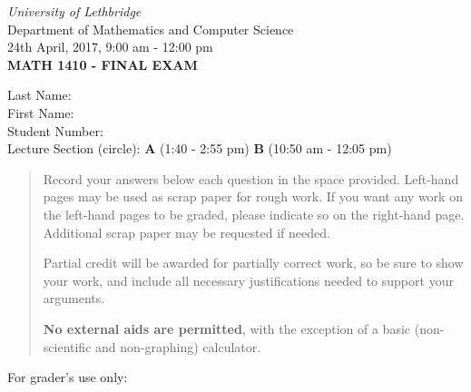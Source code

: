 \documentclass[12pt]{article}
\newcommand{\skipline}{\vspace{12pt}}
\begin{document}
\author{Instructor: Sean Fitzpatrick}
\thispagestyle{plain}
\begin{center}
\emph{University of Lethbridge}\\
Department of Mathematics and Computer Science\\
24th April, 2017, 9:00 am - 12:00 pm\\
{\bf MATH 1410 - FINAL EXAM}\\
\end{center}
\skipline \skipline \skipline \noindent \skipline
Last Name:\underline{\hspace{350pt}}\\
\skipline
First Name:\underline{\hspace{348pt}}\\
\skipline
Student Number:\underline{\hspace{322pt}}\\
\skipline
Lecture Section (circle): \quad \textbf{A} (1:40 - 2:55 pm) \qquad \textbf{B} (10:50 am - 12:05 pm)


\vspace{0.1in}


\begin{quote}

 
 Record your answers below each question in the space provided.    Left-hand pages may be used as scrap paper for rough work.  If you want any work on the left-hand pages to be graded, please indicate so on the right-hand page. Additional scrap paper may be requested if needed.
 
 \bigskip
 
 Partial credit will be awarded for partially correct work, so be sure to show your work, and include all necessary justifications needed to support your arguments. 

\bigskip

 \textbf{No external aids are permitted}, with the exception of a basic (non-scientific and non-graphing) calculator.
\end{quote}


\vspace{0.2in}

For grader's use only:
\end{document}
